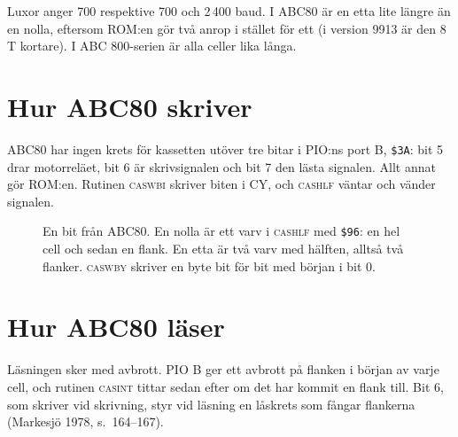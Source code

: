 \documentclass[10pt]{article}
\newcommand\kw[1]{\texttt{#1}}
\newcommand\adr[1]{\texttt{\$#1}}
\newcommand\namn[1]{\textsc{\MakeLowercase{#1}}}
\begin{document}
Luxor anger 700 respektive 700 och 2\,400 baud. I ABC80 är en etta lite
längre än en nolla, eftersom ROM:en gör två anrop i stället för ett (i
version 9913 är den 8 T kortare). I ABC 800-serien är alla celler lika
långa.

\section{Hur ABC80 skriver}

ABC80 har ingen krets för kassetten utöver tre bitar i PIO:ns port B,
\adr{3A}: bit 5 drar motorreläet, bit 6 är skrivsignalen och bit 7 den
lästa signalen. Allt annat gör ROM:en. Rutinen \namn{CASWBI} skriver biten
i CY, och \namn{CASHLF} väntar och vänder signalen.

\begin{figure}[H]
\centering
{}
\caption{En bit från ABC80. En nolla är ett varv i \namn{CASHLF} med
\adr{96}: en hel cell och sedan en flank. En etta är två varv med hälften,
alltså två flanker. \namn{CASWBY} skriver en byte bit för bit med början i
bit 0.}
\end{figure}

\section{Hur ABC80 läser}

Läsningen sker med avbrott. PIO B ger ett avbrott på flanken i början av
varje cell, och rutinen \namn{CASINT} tittar sedan efter om det har kommit
en flank till. Bit 6, som skriver vid skrivning, styr vid läsning en
låskrets som fångar flankerna (Markesjö 1978, s.~164--167).
\end{document}
